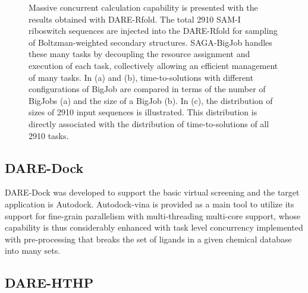 \documentclass{sig-alternate}
\begin{document}
\begin{figure}
\caption{\small Massive concurrent calculation capability is presented with the results obtained with DARE-Rfold. The total 2910 SAM-I riboswitch sequences are injected into the DARE-Rfold for sampling of Boltzman-weighted secondary structures.  SAGA-BigJob handles these many tasks by decoupling the resource assignment and execution of each task, collectively allowing an efficient management of many tasks. In (a) and (b), time-to-solutions with different configurations of BigJob are compared in terms of the number of BigJobs (a) and the size of a BigJob (b).  In (c), the distribution of sizes of 2910 input sequences is illustrated.  This distribution is directly associated with the distribution of time-to-solutions of all 2910 tasks.}
  \label{fig:dare-rfold-result} 
\end{figure}



\subsection{DARE-Dock}
DARE-Dock was developed to support the basic virtual screening and the target application is Autodock\cite{autodock}.  Autodock-vina is provided as a main tool to utilize its support for fine-grain parallelism with multi-threading multi-core support, whose capability is thus considerably enhanced with task level concurrency implemented with pre-processing that breaks the set of ligands in a given chemical database into many sets\cite{autodock-vina}.  


\subsection{DARE-HTHP}
\end{document}
